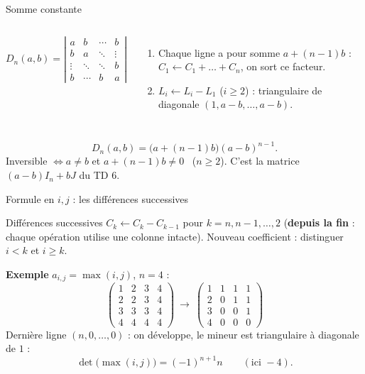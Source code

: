 \documentclass[aspectratio=169,11pt]{beamer}
\newcommand{\dt}[1]{\left|\begin{matrix}#1\end{matrix}\right|}
\begin{document}
\begin{frame}{Somme constante}
\begin{columns}[c]
\[D_n(a,b)=\dt{a&b&\cdots&b\\b&a&\ddots&\vdots\\\vdots&\ddots&\ddots&b\\b&\cdots&b&a}\]
\pause
\begin{enumerate}
\item Chaque ligne a pour somme $a+(n-1)b$ : $C_1\leftarrow C_1+\dots+C_n$, on sort ce facteur.
\item $L_i\leftarrow L_i-L_1$ ($i\geq2$) : triangulaire de diagonale $(1,a-b,\dots,a-b)$.
\end{enumerate}
\end{columns}
\pause
\begin{FORM}
\[D_n(a,b)=\big(a+(n-1)b\big)(a-b)^{n-1}.\]
Inversible $\iff a\neq b$ et $a+(n-1)b\neq0$ \ ($n\geq2$). \quad C'est la matrice $(a-b)I_n+bJ$ du TD 6.
\end{FORM}
\end{frame}

\begin{frame}{Formule en $i,j$ : les différences successives}
\begin{METH}{Différences successives}
$C_k\leftarrow C_k-C_{k-1}$ pour $k=n,n-1,\dots,2$ (\textbf{depuis la fin} : chaque opération utilise une colonne intacte).
Nouveau coefficient : distinguer $i<k$ et $i\geq k$.
\end{METH}
\pause
\textbf{Exemple} $a_{i,j}=\max(i,j)$, $n=4$ :
\[\begin{pmatrix}1&2&3&4\\2&2&3&4\\3&3&3&4\\4&4&4&4\end{pmatrix}\ \longrightarrow\
\begin{pmatrix}1&1&1&1\\2&0&1&1\\3&0&0&1\\4&0&0&0\end{pmatrix}\]
\pause
Dernière ligne $(n,0,\dots,0)$ : on développe, le mineur est triangulaire à diagonale de $1$ :
\[\det\big(\max(i,j)\big)=(-1)^{n+1}n\qquad(\text{ici }-4).\]
\end{frame}
\end{document}
